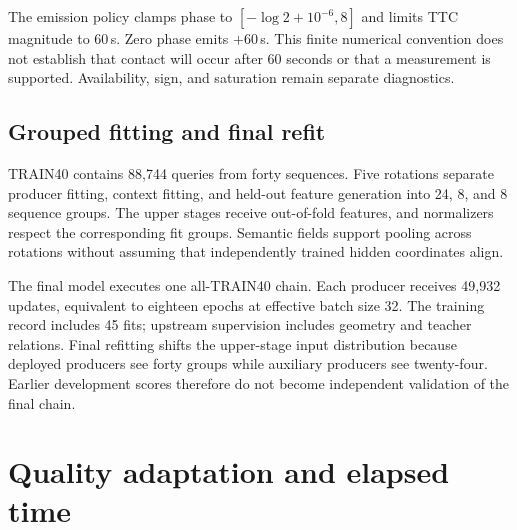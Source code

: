 \documentclass[twocolumn,letterpaper]{article}
\begin{document}
The emission policy clamps phase to $[-\log2+10^{-6},8]$ and limits TTC magnitude to 60\,s. Zero phase emits $+60$\,s. This finite numerical convention does not establish that contact will occur after 60 seconds or that a measurement is supported. Availability, sign, and saturation remain separate diagnostics.

\subsection{Grouped fitting and final refit}
TRAIN40 contains 88,744 queries from forty sequences. Five rotations separate producer fitting, context fitting, and held-out feature generation into 24, 8, and 8 sequence groups. The upper stages receive out-of-fold features, and normalizers respect the corresponding fit groups. Semantic fields support pooling across rotations without assuming that independently trained hidden coordinates align.

The final model executes one all-TRAIN40 chain. Each producer receives 49,932 updates, equivalent to eighteen epochs at effective batch size 32. The training record includes 45 fits; upstream supervision includes geometry and teacher relations. Final refitting shifts the upper-stage input distribution because deployed producers see forty groups while auxiliary producers see twenty-four. Earlier development scores therefore do not become independent validation of the final chain.

\section{Quality adaptation and elapsed time}
\label{sec:adapt}
\end{document}
